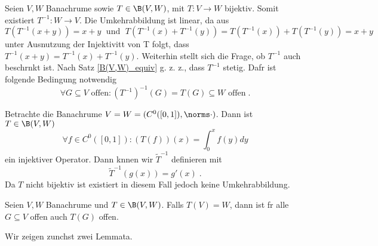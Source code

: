 \begin{rem}[Motivation]
	Seien \(V, W\) Banachr\as ume sowie \(T \in \B(V,W)\), mit \(T: V\to W\) bijektiv. Somit existiert \(T^{-1}:W\to V\). Die Umkehrabbildung ist linear, da aus
	\[T(T^{-1}(x+y)) = x +y \;\text{ und }\; T(T^{-1}(x) + T^{-1}(y)) = T(T^{-1}(x)) + T(T^{-1}(y)) = x + y\]
	unter Ausnutzung der Injektivit\as t von T folgt, dass \(T^{-1}(x+y) = T^{-1}(x) + T^{-1}(y)\). Weiterhin stellt sich die Frage, ob \(T^{-1}\) auch beschr\as nkt ist. Nach Satz \ref{B(V,W)_equiv} g. z. z., dass \(T^{-1}\) stetig. Daf\us r ist folgende Bedingung notwendig
	\[\forall G \subseteq V \text{ offen}: (T^{-1})^{-1} (G) = T(G) \subseteq W \text{ offen}\;.\]
\end{rem}
\begin{ex}
	Betrachte die Banachr\as ume \(V= W = (C^0([0,1]), \norms \cdot)\). Dann ist \(T\in \B(V,W)\)
	\[\forall f \in C^0([0,1]): (T(f))(x) = \int_0^x f(y)dy\]
	ein injektiver Operator. Dann k\os nnen wir \(\tilde T^{-1}\) definieren mit
	\[\tilde T^{-1} (g(x)) = g'(x)\;.\]
	Da \(T\) nicht bijektiv ist existiert in diesem Fall jedoch keine Umkehrabbildung.
\end{ex}

\begin{theorem}
	Seien \(V, W\) Banachr\as ume und \(T\in \B(V,W)\). Falls \(T(V) = W\), dann ist f\us r alle \(G\subseteq V\) offen auch \(T(G)\) offen.
	\label{Offene_Abb} \end{theorem}
Wir zeigen zun\as chst zwei Lemmata.


